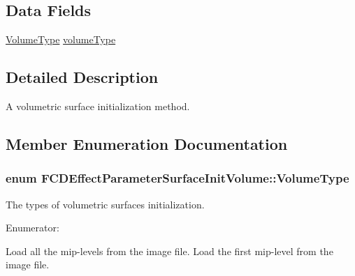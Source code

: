 \subsection*{Data Fields}
\begin{DoxyCompactItemize}
\item 
\hyperlink{classFCDEffectParameterSurfaceInitVolume_a26c9418850b0c0d5a6c685b4ce4d890b}{VolumeType} \hyperlink{classFCDEffectParameterSurfaceInitVolume_aad5bb8a564f3583dce34eb2b916d87e7}{volumeType}
\end{DoxyCompactItemize}


\subsection{Detailed Description}
A volumetric surface initialization method. 

\subsection{Member Enumeration Documentation}
\hypertarget{classFCDEffectParameterSurfaceInitVolume_a26c9418850b0c0d5a6c685b4ce4d890b}{
\subsubsection[{VolumeType}]{\setlength{\rightskip}{0pt plus 5cm}enum {\bf FCDEffectParameterSurfaceInitVolume::VolumeType}}}
\label{classFCDEffectParameterSurfaceInitVolume_a26c9418850b0c0d5a6c685b4ce4d890b}
The types of volumetric surfaces initialization. \begin{Desc}
\item[Enumerator: ]\par
\begin{description}
\item[{\em 
\hypertarget{classFCDEffectParameterSurfaceInitVolume_a26c9418850b0c0d5a6c685b4ce4d890ba13ca69673f7e1aa87c61d5ef49df4512}{
PRIMARY}
\label{classFCDEffectParameterSurfaceInitVolume_a26c9418850b0c0d5a6c685b4ce4d890ba13ca69673f7e1aa87c61d5ef49df4512}
}]Load all the mip-\/levels from the image file. Load the first mip-\/level from the image file. \end{description}
\end{Desc}



